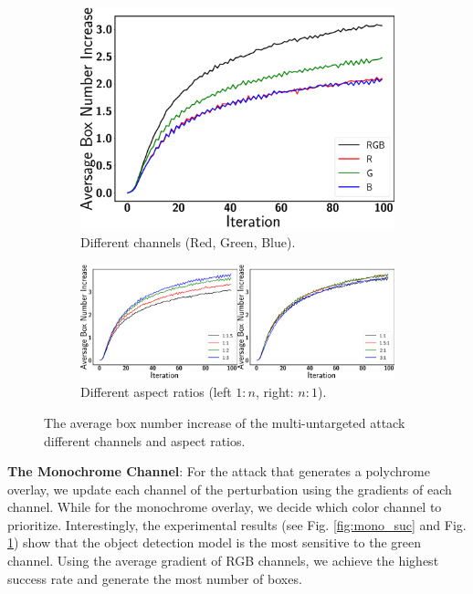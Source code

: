 \begin{figure}[H]
    \centering
    \begin{subfigure}[b]{0.5\textwidth}
        \includegraphics[width=\linewidth]{figures/chapter_detection/detection/multi_untargeted_mono_box.png}
        \caption{Different channels (Red, Green, Blue).}
         \label{fig:mono_box}
    \end{subfigure}
    \begin{subfigure}[b]{0.9\textwidth}
        \includegraphics[width=1\linewidth]{figures/chapter_detection/detection/multi_untargeted_aspect_box.png}
        \caption{Different aspect ratios (left $1:n$, right: $n:1$).}
         \label{fig:aspect_box}
    \end{subfigure}

    \caption{The average box number increase of the multi-untargeted attack different channels and aspect ratios.}
\end{figure}

\textbf{The Monochrome Channel}: For the attack that generates a polychrome overlay, we update each channel of the perturbation using the gradients of each channel. While for the monochrome overlay, we decide which color channel to prioritize. Interestingly, the experimental results (see Fig. \ref{fig:mono_suc} and Fig. \ref{fig:mono_box}) show that the object detection model is the most sensitive to the green channel. Using the average gradient of RGB channels, we achieve the highest success rate and generate the most number of boxes.

